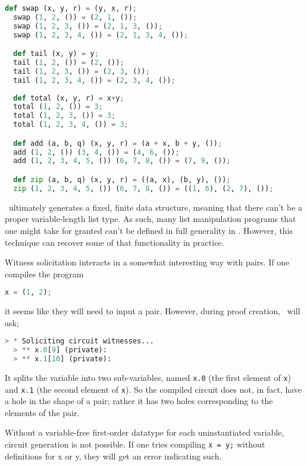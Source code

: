 \begin{lstlisting}[language=Python]
  def swap (x, y, r) = (y, x, r);
  swap (1, 2, ()) = (2, 1, ());
  swap (1, 2, 3, ()) = (2, 1, 3, ());
  swap (1, 2, 3, 4, ()) = (2, 1, 3, 4, ());

  def tail (x, y) = y;
  tail (1, 2, ()) = (2, ());
  tail (1, 2, 3, ()) = (2, 3, ());  
  tail (1, 2, 3, 4, ()) = (2, 3, 4, ());
  
  def total (x, y, r) = x+y;
  total (1, 2, ()) = 3;
  total (1, 2, 3, ()) = 3;  
  total (1, 2, 3, 4, ()) = 3;

  def add (a, b, q) (x, y, r) = (a + x, b + y, ());
  add (1, 2, ()) (3, 4, ()) = (4, 6, ());
  add (1, 2, 3, 4, 5, ()) (6, 7, 8, ()) = (7, 9, ());

  def zip (a, b, q) (x, y, r) = ((a, x), (b, y), ());
  zip (1, 2, 3, 4, 5, ()) (6, 7, 8, ()) = ((1, 6), (2, 7), ());
\end{lstlisting}

\vampir\ ultimately generates a fixed, finite data structure, meaning that there can't be a proper variable-length list type. As such, many list manipulation programs that one might take for granted can't be defined in full generality in \vampir. However, this technique can recover some of that functionality in practice.

Witness solicitation interacts in a somewhat interesting way with pairs. If one compiles the program

\begin{lstlisting}[language=Python]
  x = (1, 2);
\end{lstlisting}

it seems like they will need to input a pair. However, during proof creation, \vampir\ will ask;

\begin{lstlisting}[language=Python]
  > * Soliciting circuit witnesses...
  > ** x.0[9] (private): 
  > ** x.1[10] (private): 
\end{lstlisting}

It splits the variable into two sub-variables, named \lstinline{x.0} (the first element of \lstinline{x}) and \lstinline{x.1} (the second element of \lstinline{x}). So the compiled circuit does not, in fact, have a hole in the shape of a pair; rather it has two holes corresponding to the elements of the pair.

Without a variable-free first-order datatype for each uninstantiated variable, circuit generation is not possible. If one tries compiling \lstinline{x = y;} without definitions for x or y, they will get an error indicating such.






